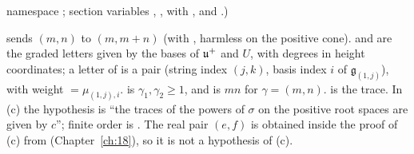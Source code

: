 namespace ; section variables ,
,
 with \lean{[∀ γ, Fintype (ι γ)]}, and
.)
\begin{dictionary}
 sends $(m,n)$ to $(m,m+n)$ (with , harmless on the positive cone).
 and  are the graded letters given by the bases of $\mathfrak{u}^+$ and $U$,
with degrees in height coordinates; a letter of  is a pair (string index $(j,k)$, basis index $i$ of
$\mathfrak g_{(1,j)}$), with weight  $=\mu_{(1,j),i}$.   is $\gamma_1,\gamma_2\ge1$, and
 is $mn$ for $\gamma=(m,n)$.   is the trace.  In (c) the hypothesis 
is ``the traces of the powers of $\sigma$ on the positive root spaces are given by $c$''; finite order is .
The real pair $(e,f)$ is obtained inside the proof of (c) from  (Chapter~\ref{ch:18}), so it is
not a hypothesis of (c).
\end{dictionary}
